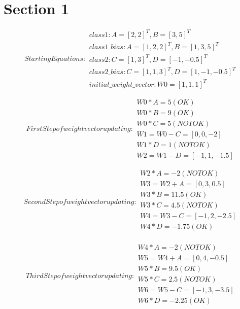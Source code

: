 \documentclass{report}
\begin{document}
\chapter{Section 1}

\begin{subequations}
  Starting Equations:
  \begin{flalign*}
    class1: A = [2, 2]^T, B = [3, 5]^T \\
    class1\_bias: A = [1, 2, 2]^T, B = [1, 3, 5]^T \\
    class2: C = [1, 3]^T, D = [-1, -0.5]^T \\
    class2\_bias: C = [1, 1, 3]^T, D = [1, -1, -0.5]^T \\
    initial\_weight\_vector: W0 = [1, 1, 1]^T
  \end{flalign*}
\end{subequations}


\begin{subequations}
  First Step of weight vector updating:
  \begin{flalign*}
    W0 * A = 5 (OK) \\
    W0 * B = 9 (OK) \\
    W0 * C = 5 (NOT OK) \\
    W1 = W0 - C = [0, 0, -2] \\
    W1 * D = 1 (NOT OK) \\
    W2 = W1 - D = [-1, 1, -1.5]
  \end{flalign*}
\end{subequations}

\begin{subequations}
  Second Step of weight vector updating:
  \begin{flalign*}
    W2 * A = -2 (NOT OK) \\
    W3 = W2 + A = [0, 3, 0.5] \\
    W3 * B = 11.5 (OK) \\
    W3 * C = 4.5 (NOT OK) \\
    W4 = W3 - C = [-1, 2, -2.5] \\
    W4 * D = -1.75 (OK) \\
  \end{flalign*}
\end{subequations}

\begin{subequations}
  Third Step of weight vector updating:
  \begin{flalign*}
    W4 * A = -2 (NOT OK) \\
    W5 = W4 + A = [0, 4, -0.5] \\
    W5 * B = 9.5 (OK) \\
    W5 * C = 2.5 (NOT OK) \\
    W6 = W5 - C = [-1, 3, -3.5] \\
    W6 * D = -2.25 (OK) \\
  \end{flalign*}
\end{subequations}
\end{document}

